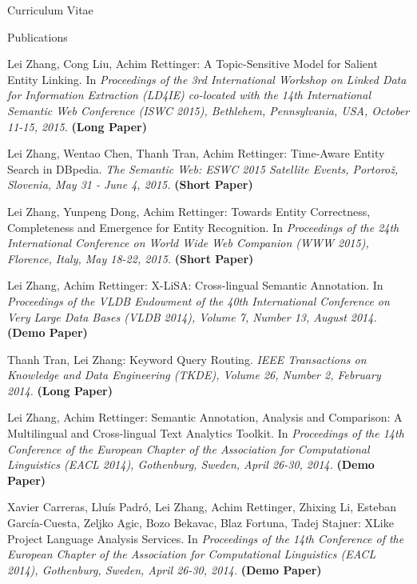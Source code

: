 \begin{cv}{\centerline{\LARGE Curriculum Vitae}}
\begin{cvlist}{Publications}
\begin{list}{}{\leftmargin=-1em}
    \item Lei Zhang, Cong Liu, Achim Rettinger: A Topic-Sensitive Model for Salient Entity Linking. In \emph{Proceedings of the 3rd International Workshop on Linked Data for Information Extraction (LD4IE) co-located with the 14th International Semantic Web Conference (ISWC 2015), Bethlehem, Pennsylvania, USA, October 11-15, 2015.}
    \textbf{(Long Paper)}
    
    \item Lei Zhang, Wentao Chen, Thanh Tran, Achim Rettinger: Time-Aware Entity Search in DBpedia. \emph{The Semantic Web: ESWC 2015 Satellite Events, Portorož, Slovenia, May 31 - June 4, 2015.}
    \textbf{(Short Paper)}
    
    \item Lei Zhang, Yunpeng Dong, Achim Rettinger: Towards Entity Correctness, Completeness and Emergence for Entity Recognition. In \emph{Proceedings of the 24th International Conference on World Wide Web Companion (WWW 2015), Florence, Italy, May 18-22, 2015.}
    \textbf{(Short Paper)}
    
    \item Lei Zhang, Achim Rettinger: X-LiSA: Cross-lingual Semantic Annotation. In \emph{ Proceedings of the VLDB Endowment of the 40th International Conference on Very Large Data Bases (VLDB 2014), Volume 7, Number 13, August 2014.}
    \textbf{(Demo Paper)}
    
    \item Thanh Tran, Lei Zhang: Keyword Query Routing. \emph{IEEE Transactions on Knowledge and Data Engineering (TKDE), Volume 26, Number 2, February 2014.}
    \textbf{(Long Paper)}
    
    \item Lei Zhang, Achim Rettinger: Semantic Annotation, Analysis and Comparison: A Multilingual and Cross-lingual Text Analytics Toolkit. In \emph{Proceedings of the 14th Conference of the European Chapter of the Association for Computational Linguistics (EACL 2014), Gothenburg, Sweden, April 26-30, 2014.}
    \textbf{(Demo Paper)}
    
    \item Xavier Carreras, Lluís Padró, Lei Zhang, Achim Rettinger, Zhixing Li, Esteban García-Cuesta, Zeljko Agic, Bozo Bekavac, Blaz Fortuna, Tadej Stajner: XLike Project Language Analysis Services. In \emph{Proceedings of the 14th Conference of the European Chapter of the Association for Computational Linguistics (EACL 2014), Gothenburg, Sweden, April 26-30, 2014.}
    \textbf{(Demo Paper)}
    

\end{list}
\end{cvlist}
\end{cv}
